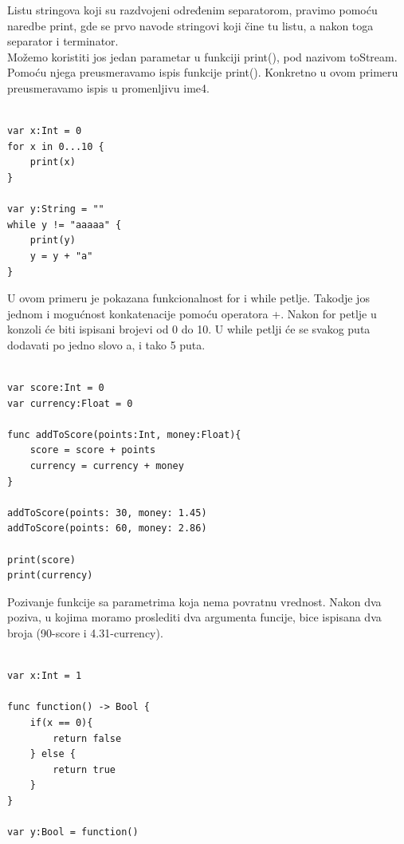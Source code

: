 \documentclass[a4paper]{article}
\begin{document}
Listu stringova koji su razdvojeni određenim separatorom, pravimo pomoću naredbe print, gde se prvo navode stringovi koji čine tu listu, a nakon toga separator i terminator.\\
Možemo koristiti jos jedan parametar u funkciji print(), pod nazivom toStream. Pomoću njega preusmeravamo ispis funkcije print(). Konkretno u ovom primeru preusmeravamo ispis u promenljivu ime4.\\


\begin{lstlisting}[caption={},frame=single, label=simple]

var x:Int = 0
for x in 0...10 {
	print(x)
}

var y:String = ""
while y != "aaaaa" {
	print(y)
	y = y + "a"
}

\end{lstlisting}

U ovom primeru je pokazana funkcionalnost for i while petlje. Takodje jos jednom i mogućnost konkatenacije pomoću operatora +. Nakon for petlje u konzoli će biti ispisani brojevi od 0 do 10. U while petlji će se svakog puta dodavati po jedno slovo a, i tako 5 puta.


\begin{lstlisting}[caption={},frame=single, label=simple]

var score:Int = 0
var currency:Float = 0

func addToScore(points:Int, money:Float){
	score = score + points
	currency = currency + money
}

addToScore(points: 30, money: 1.45)
addToScore(points: 60, money: 2.86)

print(score)
print(currency)

\end{lstlisting}

Pozivanje funkcije sa parametrima koja nema povratnu vrednost. Nakon dva poziva, u kojima moramo proslediti dva argumenta funcije, bice ispisana dva broja (90-score i 4.31-currency).\\


\begin{lstlisting}[caption={},frame=single, label=simple]

var x:Int = 1

func function() -> Bool {
	if(x == 0){
		return false
	} else {
		return true
	}
}

var y:Bool = function()

\end{lstlisting}
\end{document}
